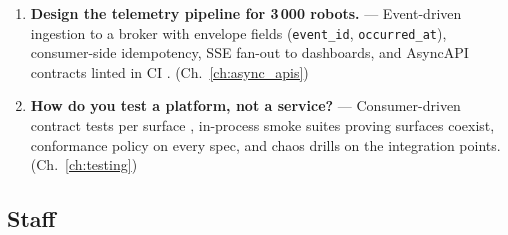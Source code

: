 \begin{enumerate}[label=\textbf{Q\arabic*.}, leftmargin=3em, start=17]
  \item \textbf{Design the telemetry pipeline for 3\,000 robots.} ---
        Event-driven ingestion to a broker with envelope fields
        (\texttt{event\_id}, \texttt{occurred\_at}), consumer-side
        idempotency, SSE fan-out to dashboards, and AsyncAPI contracts
        linted in CI \cite{asyncapi}. (Ch.~\ref{ch:async_apis})
  \item \textbf{How do you test a platform, not a service?} ---
        Consumer-driven contract tests per surface \cite{pactdocs},
        in-process smoke suites proving surfaces coexist, conformance
        policy on every spec, and chaos drills on the integration points.
        (Ch.~\ref{ch:testing})
\end{enumerate}

\subsection*{Staff}

